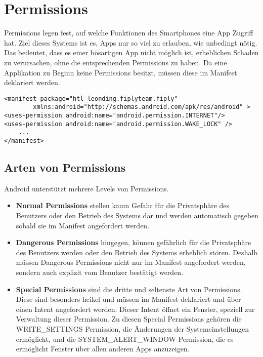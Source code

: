 \documentclass[FIPLY_base.tex]{subfiles}
\begin{document}
\section{Permissions}
Permissions legen fest, auf welche Funktionen des Smartphones eine App Zugriff hat.
Ziel dieses Systems ist es, Apps nur so viel zu erlauben, wie unbedingt nötig.
Das bedeutet, dass es einer bösartigen App nicht möglich ist, erheblichen Schaden zu verursachen, ohne die entsprechenden Permissions zu haben.
Da eine Applikation zu Beginn keine Permissions besitzt, müssen diese im Manifest deklariert werden. 
\ \\
\begin{lstlisting}
<manifest package="htl_leonding.fiplyteam.fiply"
		xmlns:android="http://schemas.android.com/apk/res/android" >
<uses-permission android:name="android.permission.INTERNET"/>
<uses-permission android:name="android.permission.WAKE_LOCK" />
	...
</manifest>
\end{lstlisting}


\subsection{Arten von Permissions}
Android unterstützt mehrere Levels von Permissions.
\begin{itemize}
\item \textbf{Normal Permissions} stellen kaum Gefahr für die Privatsphäre des Benutzers oder den Betrieb des Systems dar und werden automatisch gegeben sobald sie im Manifest angefordert werden.

\item \textbf{Dangerous Permissions} hingegen, können gefährlich für die Privatsphäre des Benutzers werden oder den Betrieb des Systems erheblich stören. 
Deshalb müssen Dangerous Permissions nicht nur im Manifest angefordert werden, sondern auch explizit vom Benutzer bestätigt werden.

\item \textbf{Special Permissions} sind die dritte und seltenste Art von Permissions. 
Diese sind besonders heikel und müssen im Manifest deklariert und über einen Intent angefordert werden.
Dieser Intent öffnet ein Fenster, speziell zur Verwaltung dieser Permission. \newline
Zu diesen Special Permissions gehören die WRITE\_SETTINGS Permission, die Änderungen der Systemeinstellungen ermöglicht, 
und die SYSTEM\_ALERT\_WINDOW Permission, die es ermöglicht Fenster über allen anderen Apps anzuzeigen.
\end{itemize}
\end{document}

